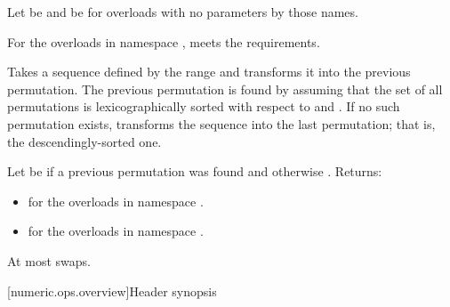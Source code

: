 \begin{itemdescr}
\pnum
Let  be 
and  be 
for overloads with no parameters by those names.

\pnum
\expects
For the overloads in namespace ,
 meets
the  requirements.

\pnum
\effects
Takes a sequence defined by the range 
and transforms it into the previous permutation.
The previous permutation is found by assuming that the set of all permutations
is lexicographically sorted with respect to  and .
If no such permutation exists,
transforms the sequence into the last permutation;
that is, the descendingly-sorted one.

\pnum
\returns
Let  be  if a previous permutation was found and
otherwise .
Returns:
\begin{itemize}
\item {} for the overloads in namespace .
\item {} for the overloads in namespace .
\end{itemize}

\pnum
\complexity
At most  swaps.
\end{itemdescr}

[numeric.ops.overview]{Header  synopsis}

